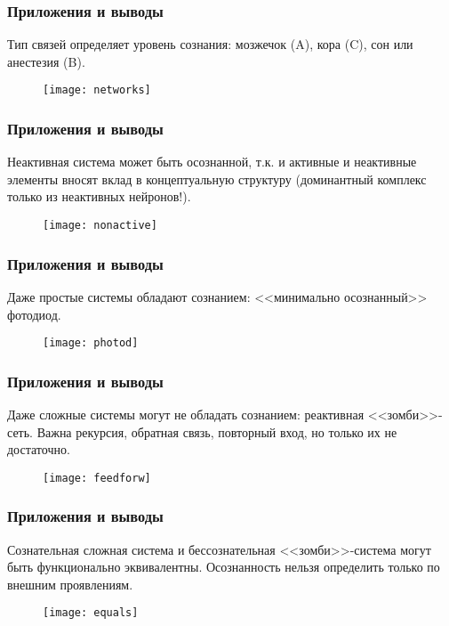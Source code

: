 \documentclass[default]{beamer}
\begin{document}
	\begin{frame}
		\frametitle{Приложения и выводы}
		
		Тип связей определяет уровень сознания: мозжечок (A), кора (C), сон или анестезия (B). 
		\begin{figure}
			\texttt{[image: networks]}
		\end{figure}
	\end{frame}
					
	\begin{frame}
		\frametitle{Приложения и выводы}
		
		Неактивная система может быть осознанной, т.к. и активные и неактивные элементы вносят вклад в концептуальную структуру (доминантный комплекс только из неактивных нейронов!).
		\begin{figure}
			\texttt{[image: nonactive]}
		\end{figure}
	\end{frame}

	\begin{frame}
		\frametitle{Приложения и выводы}
		
		Даже простые системы обладают сознанием: <<минимально осознанный>> фотодиод.
		\begin{figure}
			\texttt{[image: photod]}
		\end{figure}
	\end{frame}

	\begin{frame}
		\frametitle{Приложения и выводы}
		
		Даже сложные системы могут не обладать сознанием: реактивная <<зомби>>-сеть. Важна рекурсия, обратная связь, повторный вход, но только их не достаточно.
		\begin{figure}
			\texttt{[image: feedforw]}
		\end{figure}
	\end{frame}

	\begin{frame}
		\frametitle{Приложения и выводы}
		
		Сознательная сложная система и бессознательная <<зомби>>-система могут быть функционально эквивалентны. Осознанность нельзя определить только по внешним проявлениям.
		\begin{figure}
			\texttt{[image: equals]}
		\end{figure}
	\end{frame}
				
\end{document}
